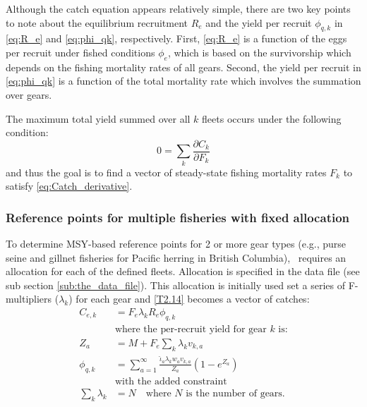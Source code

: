 Although the catch equation appears relatively simple, there are two key points to note about the equilibrium recruitment $R_e$ and the yield per recruit $\phi_{q,k}$ in \eqref{eq:R_e} and \eqref{eq:phi_qk}, respectively. First, \eqref{eq:R_e} is a function of the eggs per recruit under fished conditions $\phi_e$, which is based on the survivorship which depends on the fishing mortality rates of all gears.  Second, the yield per recruit in \eqref{eq:phi_qk} is a function of the total mortality rate which involves the summation over gears.

The maximum total yield summed over all $k$ fleets occurs under the following condition:
\begin{equation}
	0 = \sum_k \frac{\partial C_k}{\partial F_k}  \label{eq:Catch_derivative}
\end{equation}
and thus the goal is to find a vector of steady-state fishing mortality rates $F_k$ to satisfy \eqref{eq:Catch_derivative}.  




\subsubsection{Reference points for multiple fisheries with fixed allocation} %
\label{ssub:reference_points_for_multiple_fisheries}

To determine MSY-based reference points for 2 or more gear types (e.g.,  purse seine and gillnet fisheries for Pacific herring in British Columbia), \iscam\ requires an allocation for each of the defined fleets.  Allocation is specified in the data file (see sub section \ref{sub:the_data_file}).  This allocation is initially used set a series of F-multipliers ($\lambda_k$) for each gear and \eqref{T2.14} becomes a vector of catches:
\begin{align}
	C_{e,k} &= F_e \lambda_k R_e \phi_{q,k} \label{eq:12} \\
	&\mbox{where the per-recruit yield for gear $k$ is:} \nonumber \\
	Z_a &= M+F_e\sum_k \lambda_kv_{k,a}\label{eq:13}\\
	\phi_{q,k}&=\sum_{a=1}^\infty
        \frac{ \hat{\iota}_a \lambda_k w_a v_{k,a}}{Z_a}
        \left(1-e^{Z_a}\right)\label{eq:14}\\
    &\mbox{with the added constraint} \nonumber\\
    \sum_k \lambda_k &= N \label{eq:15}\quad \mbox{where $N$ is the number of gears.}
\end{align}

